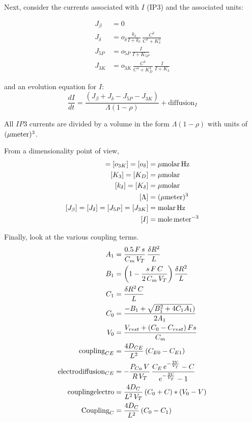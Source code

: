 \documentclass{article}
\begin{document}
\newpage
Next, consider the currents associated with $I$ (IP3) and the associated units: 
\def\kdelta{k_\delta}
\def\Kdelta{K_\delta}
\def\odelta{o_\delta}
\def\KD{K_D}

\begin{align}
J_\beta  &= 0  \\
J_\delta &= \odelta \frac{\kdelta}{I+\kdelta} \, \frac{C^2}{C^2+\Kdelta^2} \\%
J_{5P}   &= o_{5P} \, \frac{I}{I+K_{5P}}   \\ %
J_{3K}   &=  o_{3K} \, \frac{C^4}{C^4+\KD^4} \, \frac{I}{I+K_3} %
\end{align}

and an evolution equation for $I$: 
$$
\frac{dI}{dt} = \frac{(J_\beta + J_\delta - J_{5P} - J_{3K})}{\Lambda(1-\rho)} + \text{diffusion}_I
$$

All $IP3$ currents are divided by a volume in the form $\Lambda(1-\rho)$ with units of $(\mu\meter)^3$. 

From a dimensionality point of view, 
\begin{align}
[o_{5P}] = [o_{3K}] = [\odelta] &= \mu\molar\,\Hz \\
[K_3] = [K_D] &= \mu\molar \\
[\kdelta] = [\Kdelta] &= \mu\molar \\
[\Lambda] &= (\mu\meter)^3 \\
[J_\beta] = [J_\delta] = [J_{5P}] = [J_{3K}] &= \molar \, \Hz \\
[I] &= \mole \, \meter^{-3}
\end{align}


\def\couplingCe{\text{coupling}_{CE}}
\def\electrodiffusion{\text{electrodiffusion}_{CE}}
\def\couplingelectro{\text{couplingelectro}}
\def\couplingC{\text{Coupling}_C}

\newpage
Finally, look at the various coupling terms. 
\begin{align}
A_1 &= \frac{0.5\, F \, s}{C_m \, V_T} \, \frac{\dRtwo}{L} \\
B_1 &= \left(1 - \frac{s \, F \, C}{2\, C_m \, V_T}\right) \frac{\dRtwo}{L}   \\
C_1 &= \frac{\dRtwo \, C}{L}   \\
C_0 &= \frac{-B_1 + \sqrt{B_1^2 + 4C_1 A_1})}{2 A_1} \\
V_0 &= \frac{V_{rest} + (C_0 - C_{rest}) \, F  s}{C_m}  \\
\couplingCe &= \frac{4 D_{CE} }{L^2} \, (C_{E0}-C_{E1}) \\
\electrodiffusion &= -\frac{P_{Ca} \, V}{R \, V_T} \, \frac{C_E\, e^{-\frac{2V}{V_T}} - C} {e^{-\frac{2V}{V_T}} - 1}  \\
\couplingelectro  &= \frac{4 D_C}{L^2 \, V_T} \, (C_0 + C) * (V_0 - V)   \\
\couplingC        &= \frac{4 D_C}{L^2} \, (C_0 - C_1) 
\end{align}
\end{document}
